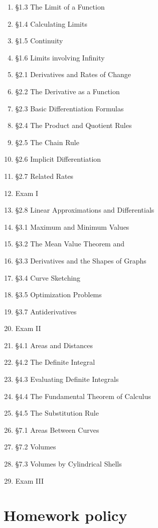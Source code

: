 \documentclass[11pt]{article}
\begin{document}
\begin{multicols}{2}
\begin{enumerate} \itemsep -3pt
    \item \S1.3 The Limit of a Function
    \item \S1.4 Calculating Limits
    \item \S1.5 Continuity
    \item \S1.6 Limits involving Infinity
    \item \S2.1 Derivatives and Rates of Change
    \item \S2.2 The Derivative as a Function
    \item \S2.3 Basic Differentiation Formulas
    \item \S2.4 The Product and Quotient Rules
    \item \S2.5 The Chain Rule
    \item \S2.6 Implicit Differentiation
    \item \S2.7 Related Rates
    \item Exam I
    \item \S2.8 Linear Approximations and Differentials
    \item \S3.1 Maximum and Minimum Values
    \item \S3.2 The Mean Value Theorem and
    \item \S3.3 Derivatives and the Shapes of Graphs
    \item \S3.4 Curve Sketching
    \item \S3.5 Optimization Problems
    \item \S3.7 Antiderivatives
    \item Exam II
    \item \S4.1 Areas and Distances
    \item \S4.2 The Definite Integral
    \item \S4.3 Evaluating Definite Integrals
    \item \S4.4 The Fundamental Theorem of Calculus
    \item \S4.5 The Substitution Rule
    \item \S7.1 Areas Between Curves
    \item \S7.2 Volumes
    \item \S7.3 Volumes by Cylindrical Shells
    \item Exam III
\end{enumerate}
\end{multicols}

\section{Homework policy}
\end{document}
